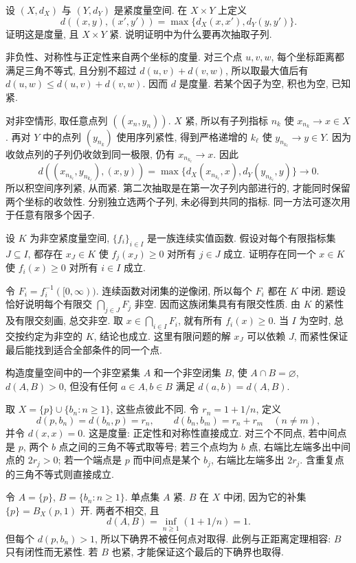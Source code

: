 \begin{exercise}
\label{ch:compact:ex-product}
设 $(X,d_X)$ 与 $(Y,d_Y)$ 是紧度量空间. 在 $X\times Y$ 上定义
\[
 d((x,y),(x',y'))=\max\{d_X(x,x'),d_Y(y,y')\}.
\]
证明这是度量, 且 $X\times Y$ 紧. 说明证明中为什么要再次抽取子列.
\end{exercise}
\begin{solution}
非负性、对称性与正定性来自两个坐标的度量. 对三个点 $u,v,w$, 每个坐标距离都满足三角不等式, 且分别不超过 $d(u,v)+d(v,w)$, 所以取最大值后有 $d(u,w)\leq d(u,v)+d(v,w)$. 因而 $d$ 是度量. 若某个因子为空, 积也为空, 已知紧.

对非空情形, 取任意点列 $((x_n,y_n))$. $X$ 紧, 所以有子列指标 $n_k$ 使 $x_{n_k}\to x\in X$. 再对 $Y$ 中的点列 $(y_{n_k})$ 使用序列紧性, 得到严格递增的 $k_\ell$ 使 $y_{n_{k_\ell}}\to y\in Y$. 因为收敛点列的子列仍收敛到同一极限, 仍有 $x_{n_{k_\ell}}\to x$. 因此
\[
 d((x_{n_{k_\ell}},y_{n_{k_\ell}}),(x,y))
 =\max\{d_X(x_{n_{k_\ell}},x),d_Y(y_{n_{k_\ell}},y)\}
 \longrightarrow0.
\]
所以积空间序列紧, 从而紧. 第二次抽取是在第一次子列内部进行的, 才能同时保留两个坐标的收敛性. 分别独立选两个子列, 未必得到共同的指标. 同一方法可逐次用于任意有限多个因子.
\end{solution}

\begin{exercise}
\label{ch:compact:ex-finite-constraints}
设 $K$ 为非空紧度量空间, $\{f_i\}_{i\in I}$ 是一族连续实值函数. 假设对每个有限指标集 $J\subseteq I$, 都存在 $x_J\in K$ 使 $f_j(x_J)\geq0$ 对所有 $j\in J$ 成立. 证明存在同一个 $x\in K$ 使 $f_i(x)\geq0$ 对所有 $i\in I$ 成立.
\end{exercise}
\begin{solution}
令 $F_i=f_i^{-1}([0,\infty))$. 连续函数对闭集的逆像闭, 所以每个 $F_i$ 都在 $K$ 中闭. 题设恰好说明每个有限交 $\bigcap_{j\in J}F_j$ 非空. 因而这族闭集具有有限交性质. 由 $K$ 的紧性及有限交刻画, 总交非空. 取 $x\in\bigcap_{i\in I}F_i$, 就有所有 $f_i(x)\geq0$. 当 $I$ 为空时, 总交按约定为非空的 $K$, 结论也成立. 这里有限问题的解 $x_J$ 可以依赖 $J$, 而紧性保证最后能找到适合全部条件的同一个点.
\end{solution}

\begin{exercise}
\label{ch:compact:ex-distance-attainment}
构造度量空间中的一个非空紧集 $A$ 和一个非空闭集 $B$, 使 $A\cap B=\varnothing$, $d(A,B)>0$, 但没有任何 $a\in A,b\in B$ 满足 $d(a,b)=d(A,B)$.
\end{exercise}
\begin{solution}
取 $X=\{p\}\cup\{b_n:n\geq1\}$, 这些点彼此不同. 令 $r_n=1+1/n$, 定义
\[
 d(p,b_n)=d(b_n,p)=r_n,\qquad
 d(b_n,b_m)=r_n+r_m\quad(n\ne m),
\]
并令 $d(x,x)=0$. 这是度量: 正定性和对称性直接成立. 对三个不同点, 若中间点是 $p$, 两个 $b$ 点之间的三角不等式取等号; 若三个点均为 $b$ 点, 右端比左端多出中间点的 $2r_j>0$; 若一个端点是 $p$ 而中间点是某个 $b_j$, 右端比左端多出 $2r_j$. 含重复点的三角不等式则直接成立.

令 $A=\{p\}$, $B=\{b_n:n\geq1\}$. 单点集 $A$ 紧. $B$ 在 $X$ 中闭, 因为它的补集 $\{p\}=B_X(p,1)$ 开. 两者不相交, 且
\[
 d(A,B)=\inf_{n\geq1}(1+1/n)=1.
\]
但每个 $d(p,b_n)>1$, 所以下确界不被任何点对取得. 此例与正距离定理相容: $B$ 只有闭性而无紧性. 若 $B$ 也紧, 才能保证这个最后的下确界也取得.
\end{solution}

